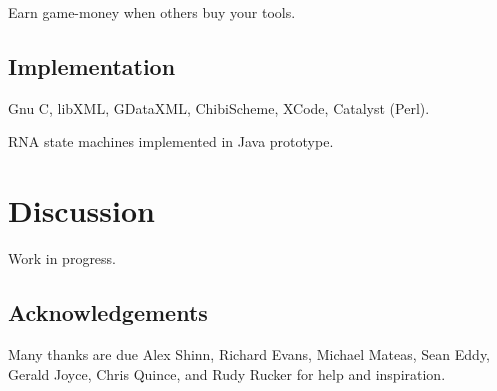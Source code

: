 \documentclass{acm_proc_article-sp}
\begin{document}
Earn game-money when others buy your tools.

\subsection{Implementation}

Gnu C, libXML, GDataXML, ChibiScheme, XCode, Catalyst (Perl).

RNA state machines implemented in Java prototype.

\section{Discussion}

Work in progress.

\subsection{Acknowledgements}

Many thanks are due Alex Shinn, Richard Evans, Michael Mateas, Sean Eddy, Gerald Joyce, Chris Quince,
and Rudy Rucker for help and inspiration.




\balancecolumns
\end{document}
